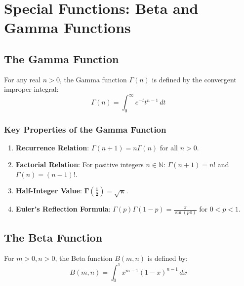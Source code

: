 \section{Special Functions: Beta and Gamma Functions}

\subsection{The Gamma Function}

\begin{definition}
For any real $n > 0$, the Gamma function $\Gamma(n)$ is defined by the convergent improper integral:
\begin{equation}
    \Gamma(n) = \int_0^\infty e^{-t} t^{n-1}\,dt
\end{equation}
\end{definition}

\subsubsection{Key Properties of the Gamma Function}
\begin{enumerate}[leftmargin=1.5em]
    \item \textbf{Recurrence Relation}: $\Gamma(n+1) = n \Gamma(n)$ for all $n > 0$.
    \item \textbf{Factorial Relation}: For positive integers $n \in \mathbb{N}$: $\Gamma(n+1) = n!$ and $\Gamma(n) = (n-1)!$.
    \item \textbf{Half-Integer Value}: $\mathbf{\Gamma\left(\frac{1}{2}\right) = \sqrt{\pi}}$.
    \item \textbf{Euler's Reflection Formula}: $\Gamma(p) \Gamma(1-p) = \frac{\pi}{\sin(p\pi)}$ for $0 < p < 1$.
\end{enumerate}

\subsection{The Beta Function}

\begin{definition}
For $m > 0, n > 0$, the Beta function $B(m,n)$ is defined by:
\begin{equation}
    B(m,n) = \int_0^1 x^{m-1}(1-x)^{n-1}\,dx
\end{equation}
\end{definition}

